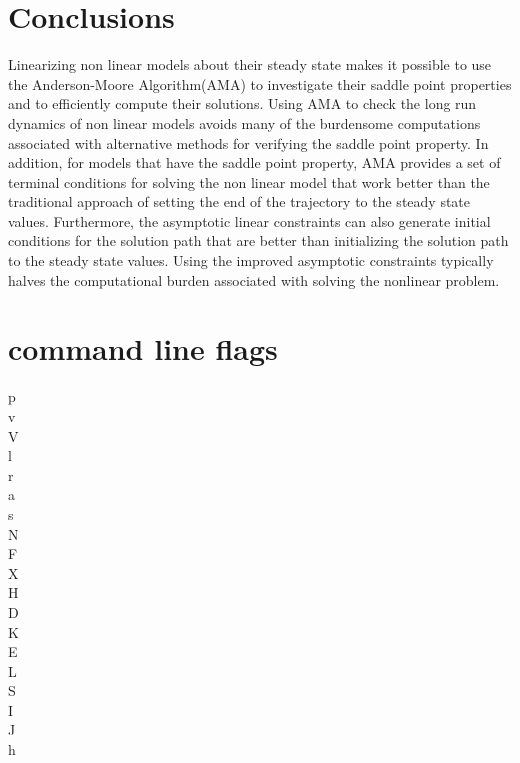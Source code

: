 \documentclass[12pt]{article}
\begin{document}
\section{Conclusions}
Linearizing non linear models about their steady state makes it possible
to use the Anderson-Moore Algorithm(AMA) to investigate their saddle point 
properties and to efficiently compute their solutions.
Using AMA to check the long run dynamics 
of non linear  models 
avoids many of the burdensome computations associated with 
alternative methods for verifying the saddle point property.
In addition,
 for models that have the saddle point property, AMA provides a set of 
terminal conditions for solving the non linear model
that work better than the traditional approach of 
setting the end of the trajectory to the steady state values.
Furthermore, the 
asymptotic linear constraints can also generate initial conditions
for the solution path
that are better than initializing the solution path to the steady
state values.
Using the improved asymptotic constraints typically halves the computational
burden associated with solving the nonlinear problem.



\nocite{GUCKENHEIMERHOLMES,FUHRER:96}
%



\newpage
\appendix

\section{command line flags}
\label{sec:command-line-flags}

\begin{description}
\item[p] 
\item[v] 
\item[V] 
\item[l] 
\item[r] 
\item[a] 
\item[s] 
\item[N] 
\item[F] 
\item[X] 
\item[H] 
\item[D] 
\item[K] 
\item[E] 
\item[L] 
\item[S] 
\item[I] 
\item[J] 
\item[h] 
\end{description}
\end{document}
